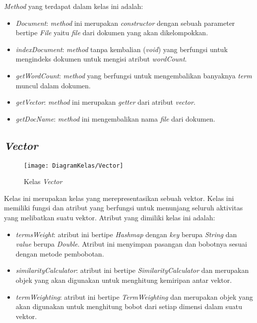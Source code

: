 \textit{Method} yang terdapat dalam kelas ini adalah:

\begin{itemize}
	\item \textit{Document}: \textit{method} ini merupakan \textit{constructor} dengan sebuah parameter bertipe \textit{File} yaitu \textit{file} dari dokumen yang akan dikelompokkan.
	\item \textit{indexDocument}: \textit{method} tanpa kembalian (\textit{void}) yang berfungsi untuk mengindeks dokumen untuk mengisi atribut \textit{wordCount}.
	\item \textit{getWordCount}: \textit{method} yang berfungsi untuk mengembalikan banyaknya \textit{term} muncul dalam dokumen.
	\item \textit{getVector}: \textit{method} ini merupakan \textit{getter} dari atribut \textit{vector}.
	\item \textit{getDocName}: \textit{method} ini mengembalikan nama \textit{file} dari dokumen.
\end{itemize}

\subsection{\textit{Vector}}

\begin{figure}[H]
	\begin{center}
		\texttt{[image: DiagramKelas/Vector]}
		\caption{Kelas \textit{Vector}}
		\label{fig:kelasVector}
	\end{center}
\end{figure}

Kelas ini merupakan kelas yang merepresentasikan sebuah vektor. Kelas ini memiliki fungsi dan atribut yang berfungsi untuk menunjang seluruh aktivitas yang melibatkan suatu vektor. Atribut yang dimiliki kelas ini adalah:

\begin{itemize}
	\item \textit{termsWeight}: atribut ini bertipe \textit{Hashmap} dengan \textit{key} berupa \textit{String} dan \textit{value} berupa \textit{Double}. Atribut ini menyimpan pasangan \term dan bobotnya sesuai dengan metode pembobotan.
	\item \textit{similarityCalculator}: atribut ini bertipe \textit{SimilarityCalculator} dan merupakan objek yang akan digunakan untuk menghitung kemiripan antar vektor.
	\item \textit{termWeighting}: atribut ini bertipe \textit{TermWeighting} dan merupakan objek yang akan digunakan untuk menghitung bobot dari setiap dimensi dalam suatu vektor.
\end{itemize}

